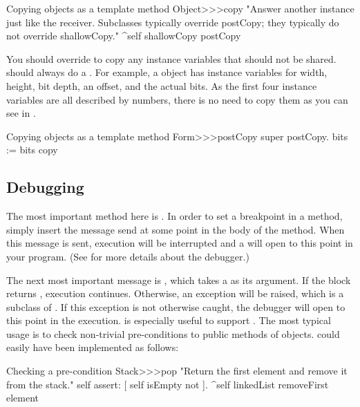 \documentclass[a4paper,10pt,twoside]{book}
\begin{document}
\begin{method}{Copying objects as a template method}
Object>>>copy
    "Answer another instance just like the receiver. Subclasses typically override postCopy; they typically do not override shallowCopy."
    ^self shallowCopy postCopy
\end{method}

You should override  to copy any instance variables that should not be shared.
 should always do a . 
For example, a  object has instance variables for width, height, bit depth, an offset, and the actual bits. 
As the first four instance variables are all described by numbers, there is no need to copy them as you can see in .

\begin{method}{Copying objects as a template method}
Form>>>postCopy
    super postCopy.
    bits := bits copy
\end{method}



\subsection{Debugging}

The most important method here is .
In order to set a breakpoint in a method, simply insert the message send  at some point in the body of the method.
When this message is sent, execution will be interrupted and a  will open to this point in your program.
(See  for more details about the debugger.)


The next most important message is , which takes a  as its argument.
If the block returns , execution continues.
Otherwise, an  exception will be raised, which is a subclass of .
If this exception is not otherwise caught, the debugger will open to this point in the execution.
 is especially useful to support .
The most typical usage is to check non-trivial pre-conditions to public methods of objects.
 could easily have been implemented as follows:

\begin{method}{Checking a pre-condition}
Stack>>>pop
    "Return the first element and remove it from the stack."
    self assert: [ self isEmpty not ].
    ^self linkedList removeFirst element
\end{method}
\end{document}
